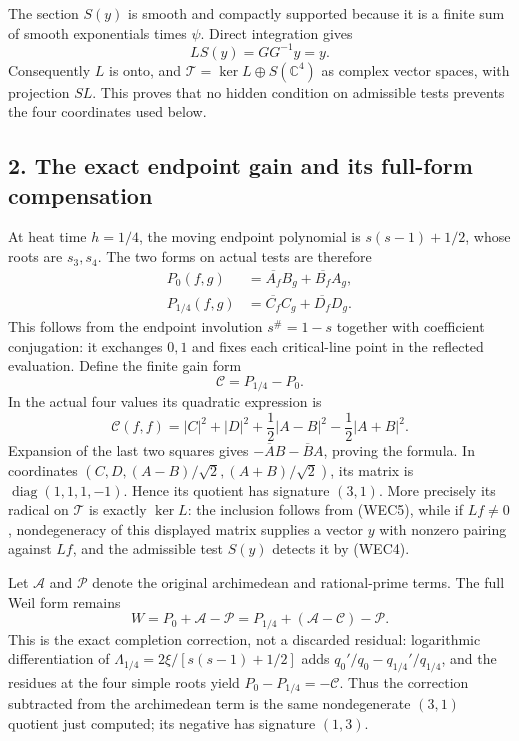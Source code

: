 \documentclass[
  10pt,
  a4paper,
]{article}
\begin{document}
The section \(S(y)\) is smooth and compactly supported because it is a
finite sum of smooth exponentials times \(\psi\). Direct integration
gives \[
L S(y)=GG^{-1}y=y.
\tag{WEC4}
\] Consequently \(L\) is onto, and
\(\mathcal T=\ker L\oplus S(\mathbb C^4)\) as complex vector spaces,
with projection \(SL\). This proves that no hidden condition on
admissible tests prevents the four coordinates used below.

\subsection{2. The exact endpoint gain and its full-form
compensation}\label{the-exact-endpoint-gain-and-its-full-form-compensation}

At heat time \(h=1/4\), the moving endpoint polynomial is
\(s(s-1)+1/2\), whose roots are \(s_3,s_4\). The two forms on actual
tests are therefore \[
\begin{aligned}
P_0(f,g)&=\overline{A_f}B_g+\overline{B_f}A_g,\\
P_{1/4}(f,g)&=\overline{C_f}C_g+\overline{D_f}D_g.
\end{aligned}
\tag{WEC5}
\] This follows from the endpoint involution \(s^\#=1-s\) together with
coefficient conjugation: it exchanges \(0,1\) and fixes each
critical-line point in the reflected evaluation. Define the finite gain
form \[
\mathcal C=P_{1/4}-P_0.
\tag{WEC6}
\] In the actual four values its quadratic expression is \[
\mathcal C(f,f)=|C|^2+|D|^2+\frac{1}{2}|A-B|^2-\frac{1}{2}|A+B|^2.
\tag{WEC7}
\] Expansion of the last two squares gives
\(-\overline A B-\overline B A\), proving the formula. In coordinates
\((C,D,(A-B)/\sqrt2,(A+B)/\sqrt2)\), its matrix is
\(\operatorname{diag}(1,1,1,-1)\). Hence its quotient has signature
\((3,1)\). More precisely its radical on \(\mathcal T\) is exactly
\(\ker L\): the inclusion follows from (WEC5), while if \(Lf\ne0\),
nondegeneracy of this displayed matrix supplies a vector \(y\) with
nonzero pairing against \(Lf\), and the admissible test \(S(y)\) detects
it by (WEC4).

Let \(\mathcal A\) and \(\mathcal P\) denote the original archimedean
and rational-prime terms. The full Weil form remains \[
W=P_0+\mathcal A-\mathcal P
=P_{1/4}+(\mathcal A-\mathcal C)-\mathcal P.
\tag{WEC8}
\] This is the exact completion correction, not a discarded residual:
logarithmic differentiation of \(\Lambda_{1/4}=2\xi/[s(s-1)+1/2]\) adds
\(q_0'/q_0-q_{1/4}'/q_{1/4}\), and the residues at the four simple roots
yield \(P_0-P_{1/4}=-\mathcal C\). Thus the correction subtracted from
the archimedean term is the same nondegenerate \((3,1)\) quotient just
computed; its negative has signature \((1,3)\).
\end{document}
